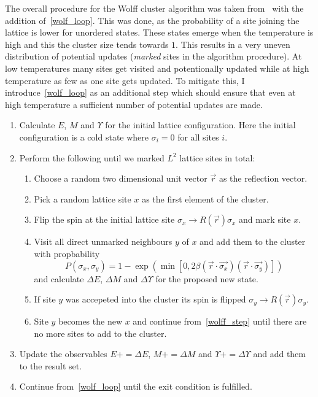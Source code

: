 		The overall procedure for the Wolff cluster algorithm was taken from~\cite[p. 361]{wolff} with the addition of~\cref{wolf_loop}. This was done, as the probability of a site joining the lattice is lower for unordered states. These states emerge when the temperature is high and this the cluster size tends towards $1$. This results in a very uneven distribution of potential updates (\emph{marked} sites in the algorithm procedure). At low temperatures many sites get visited and potentionally updated while at high temperature as few as one site gets updated. To mitigate this, I introduce~\cref{wolf_loop} as an additional step which should ensure that even at high temperature a sufficient number of potential updates are made.
		\begin{enumerate}
			\item Calculate $E$, $M$ and $\Upsilon$ for the initial lattice configuration. Here the initial configuration is a cold state where $\sigma_i = 0$ for all sites $i$.
			\item \label{wolf_loop} Perform the following until we marked $L^2$ lattice sites in total:
			\begin{enumerate}
				\item Choose a random two dimensional unit vector $\vec{r}$ as the reflection vector.
				\item Pick a random lattice site $x$ as the first element of the cluster.
				\item Flip the spin at the initial lattice site $\sigma_x \rightarrow R(\vec{r}) \sigma_x$ and mark site $x$.
				\item \label{wolff_step} Visit all direct unmarked neighbours $y$ of $x$ and add them to the cluster with propbability
					\begin{equation}
						P(\sigma_x, \sigma_y) = 1 - \exp(\min[0, 2 \beta (\vec{r}\cdot\vec{\sigma_x}) (\vec{r}\cdot\vec{\sigma_y})])
					\end{equation}
					and calculate $\Delta E$, $\Delta M$ and $\Delta \Upsilon$ for the proposed new state.
				\item If site $y$ was accepeted into the cluster its spin is flipped $\sigma_y \rightarrow R(\vec{r}) \sigma_y$.
				\item Site $y$ becomes the new $x$ and continue from~\cref{wolff_step} until there are no more sites to add to the cluster.
			\end{enumerate}
			\item Update the observables $E \mathrel{{+}{=}} \Delta E$, $M \mathrel{{+}{=}} \Delta M$ and $\Upsilon \mathrel{{+}{=}} \Delta \Upsilon$ and add them to the result set.
			\item Continue from~\cref{wolf_loop} until the exit condition is fulfilled.
		\end{enumerate}
		
